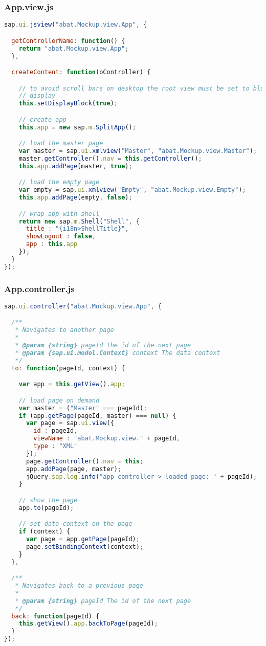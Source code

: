 \newpage
\subsubsection*{App.view.js}
\begin{lstlisting}[language=JavaScript, label=lst:App.view.js]
sap.ui.jsview("abat.Mockup.view.App", {

  getControllerName: function() {
    return "abat.Mockup.view.App";
  },

  createContent: function(oController) {

    // to avoid scroll bars on desktop the root view must be set to block
    // display
    this.setDisplayBlock(true);

    // create app
    this.app = new sap.m.SplitApp();

    // load the master page
    var master = sap.ui.xmlview("Master", "abat.Mockup.view.Master");
    master.getController().nav = this.getController();
    this.app.addPage(master, true);

    // load the empty page
    var empty = sap.ui.xmlview("Empty", "abat.Mockup.view.Empty");
    this.app.addPage(empty, false);

    // wrap app with shell
    return new sap.m.Shell("Shell", {
      title : "{i18n>ShellTitle}",
      showLogout : false,
      app : this.app
    });
  }
});
\end{lstlisting}

\newpage
\subsubsection*{App.controller.js}
\begin{lstlisting}[language=JavaScript, label=lst:App.controller.js]
sap.ui.controller("abat.Mockup.view.App", {

  /**
   * Navigates to another page
   * 
   * @param {string} pageId The id of the next page
   * @param {sap.ui.model.Context} context The data context
   */
  to: function(pageId, context) {

    var app = this.getView().app;

    // load page on demand
    var master = ("Master" === pageId);
    if (app.getPage(pageId, master) === null) {
      var page = sap.ui.view({
        id : pageId,
        viewName : "abat.Mockup.view." + pageId,
        type : "XML"
      });
      page.getController().nav = this;
      app.addPage(page, master);
      jQuery.sap.log.info("app controller > loaded page: " + pageId);
    }

    // show the page
    app.to(pageId);

    // set data context on the page
    if (context) {
      var page = app.getPage(pageId);
      page.setBindingContext(context);
    }
  },

  /**
   * Navigates back to a previous page
   * 
   * @param {string} pageId The id of the next page
   */
  back: function(pageId) {
    this.getView().app.backToPage(pageId);
  }
});
\end{lstlisting}

